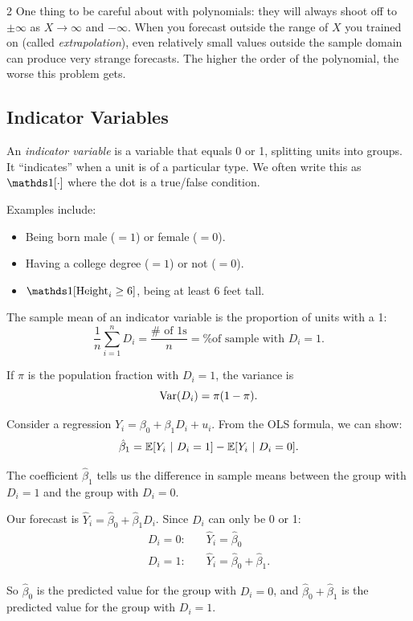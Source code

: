 \documentclass[12pt]{article}
\begin{document}
\begin{multicols}{2}
  One thing to be careful about with polynomials: they will always shoot off to $\pm \infty$ as $X \to \infty$ and $-\infty$. When you forecast outside the range of $X$ you trained on (called \emph{extrapolation}), even relatively small values outside the sample domain can produce very strange forecasts. The higher the order of the polynomial, the worse this problem gets.

  \subsection*{Indicator Variables}

  An \emph{indicator variable} is a variable that equals 0 or 1, splitting units into groups. It ``indicates'' when a unit is of a particular type. We often write this as $\one{\cdot}$ where the dot is a true/false condition.

  Examples include:
  \begin{itemize}
    \item Being born male ($=1$) or female ($=0$).
    \item Having a college degree ($=1$) or not ($=0$).
    \item $\one{\text{Height}_i \geq 6}$, being at least 6 feet tall.
  \end{itemize}

  The sample mean of an indicator variable is the proportion of units with a 1:
  $$\frac{1}{n} \sum_{i=1}^n D_i = \frac{\# \text{ of } 1\text{s}}{n} = \text{\% of sample with } D_i = 1.$$

  If $\pi$ is the population fraction with $D_i = 1$, the variance is
  $$\var(D_i) = \pi (1 - \pi).$$

  Consider a regression $Y_i = \beta_0 + \beta_1 D_i + u_i$. From the OLS formula, we can show:
  $$\hat{\beta}_1 = \expec{Y_i}{D_i = 1} - \expec{Y_i}{D_i = 0}.$$

  The coefficient $\hat{\beta}_1$ tells us the difference in sample means between the group with $D_i = 1$ and the group with $D_i = 0$.

  Our forecast is $\hat{Y}_i = \hat{\beta}_0 + \hat{\beta}_1 D_i$. Since $D_i$ can only be 0 or 1:
  \begin{align*}
    D_i = 0: & \quad \hat{Y}_i = \hat{\beta}_0                  \\
    D_i = 1: & \quad \hat{Y}_i = \hat{\beta}_0 + \hat{\beta}_1.
  \end{align*}

  So $\hat{\beta}_0$ is the predicted value for the group with $D_i = 0$, and $\hat{\beta}_0 + \hat{\beta}_1$ is the predicted value for the group with $D_i = 1$.


\end{multicols}
\end{document}
